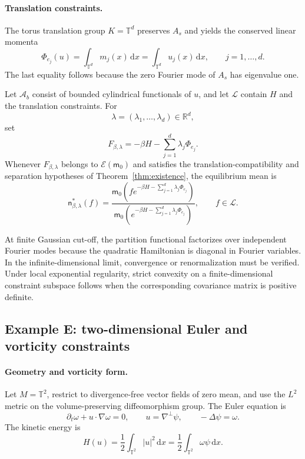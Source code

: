 \documentclass[11pt,reqno]{amsart}
\begin{document}
\paragraph{\bfseries Translation constraints.}
The torus translation group $K=\mathbb T^d$ preserves $A_s$ and yields
the conserved linear momenta
\[
\Phi_{e_j}(u)
=
\int_{\mathbb T^d}m_j(x)\,\mathrm dx
=
\int_{\mathbb T^d}u_j(x)\,\mathrm dx,
\qquad
j=1,\ldots,d.
\]
The last equality follows because the zero Fourier mode of $A_s$ has
eigenvalue one.

Let $\mathcal A_b$ consist of bounded cylindrical functionals of $u$,
and let $\mathcal L$ contain $H$ and the translation constraints. For
\[
\lambda=(\lambda_1,\ldots,\lambda_d)\in\mathbb R^d,
\]
set
\[
F_{\beta,\lambda}
=
-\beta H-\sum_{j=1}^{d}\lambda_j\Phi_{e_j}.
\]
Whenever $F_{\beta,\lambda}$ belongs to
$\mathcal E(\mathsf m_0)$ and satisfies the
translation-compatibility and separation hypotheses of
Theorem~\ref{thm:existence}, the equilibrium mean is
\[
\boxed{
\mathsf n_{\beta,\lambda}^*(f)
=
\frac{
\mathsf m_0
\left(
f e^{-\beta H-\sum_{j=1}^{d}\lambda_j\Phi_{e_j}}
\right)
}{
\mathsf m_0
\left(
e^{-\beta H-\sum_{j=1}^{d}\lambda_j\Phi_{e_j}}
\right)
},
\qquad
f\in\mathcal L.
}
\]

At finite Gaussian cut-off, the partition functional factorizes over
independent Fourier modes because the quadratic Hamiltonian is diagonal
in Fourier variables. In the infinite-dimensional limit, convergence
or renormalization must be verified. Under local exponential
regularity, strict convexity on a finite-dimensional constraint
subspace follows when the corresponding covariance matrix is positive
definite.

\subsection{Example E: two-dimensional Euler and vorticity constraints}

\paragraph{\bfseries Geometry and vorticity form.}
Let $M=\mathbb T^2$, restrict to divergence-free vector fields of zero
mean, and use the $L^2$ metric on the volume-preserving diffeomorphism
group. The Euler equation is
\[
\partial_t\omega+u\cdot\nabla\omega=0,
\qquad
u=\nabla^\perp\psi,
\qquad
-\Delta\psi=\omega.
\]
The kinetic energy is
\[
H(u)
=
\frac12
\int_{\mathbb T^2}|u|^2\,\mathrm dx
=
\frac12
\int_{\mathbb T^2}\omega\psi\,\mathrm dx.
\]
\end{document}
